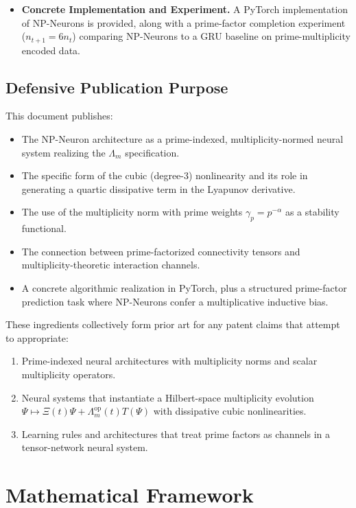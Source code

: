 \documentclass[11pt]{article}
\begin{document}
\begin{itemize}[leftmargin=*]
  \item \textbf{Concrete Implementation and Experiment.}
  A PyTorch implementation of NP-Neurons is provided, along with a prime-factor completion experiment (\(n_{t+1}=6n_t\)) comparing NP-Neurons to a GRU baseline on prime-multiplicity encoded data.
\end{itemize}

\subsection{Defensive Publication Purpose}

This document publishes:

\begin{itemize}[leftmargin=*]
  \item The NP-Neuron architecture as a prime-indexed, multiplicity-normed neural system realizing the \(\Lambda_m\) specification.
  \item The specific form of the cubic (degree-3) nonlinearity and its role in generating a quartic dissipative term in the Lyapunov derivative.
  \item The use of the multiplicity norm with prime weights \(\gamma_p=p^{-\alpha}\) as a stability functional.
  \item The connection between prime-factorized connectivity tensors and multiplicity-theoretic interaction channels.
  \item A concrete algorithmic realization in PyTorch, plus a structured prime-factor prediction task where NP-Neurons confer a multiplicative inductive bias.
\end{itemize}

These ingredients collectively form prior art for any patent claims that attempt to appropriate:

\begin{enumerate}[leftmargin=*]
  \item Prime-indexed neural architectures with multiplicity norms and scalar multiplicity operators.
  \item Neural systems that instantiate a Hilbert-space multiplicity evolution \(\Psi \mapsto \Xi(t)\Psi + \Lambda^{\mathrm{op}}_m(t)T(\Psi)\) with dissipative cubic nonlinearities.
  \item Learning rules and architectures that treat prime factors as channels in a tensor-network neural system.
\end{enumerate}

\section{Mathematical Framework}
\end{document}
